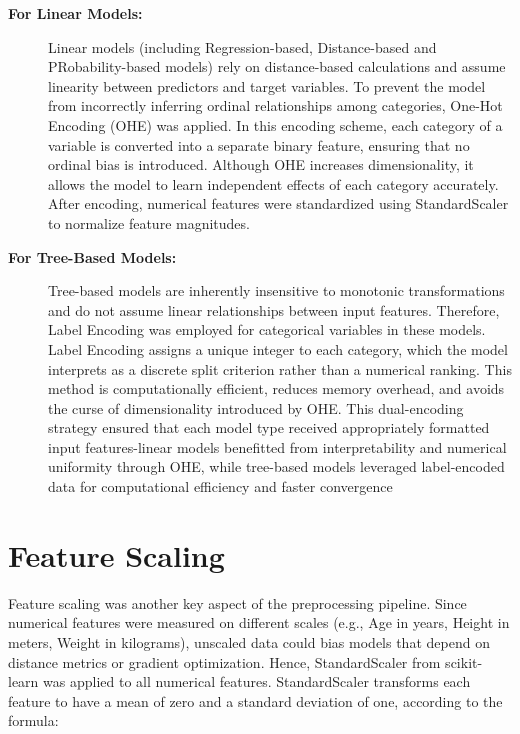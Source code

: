 \begin{description}
    \item[\textbf{For Linear Models:}]
    Linear models (including Regression-based, Distance-based and PRobability-based models) rely on distance-based calculations and assume linearity between predictors and target variables.
    To prevent the model from incorrectly inferring ordinal relationships among categories, One-Hot Encoding (OHE) was applied.
    In this encoding scheme, each category of a variable is converted into a separate binary feature, ensuring that no ordinal bias is introduced.
    Although OHE increases dimensionality, it allows the model to learn independent effects of each category accurately.
    After encoding, numerical features were standardized using StandardScaler to normalize feature magnitudes.

    \item[\textbf{For Tree-Based Models:}]
    Tree-based models are inherently insensitive to monotonic transformations and do not assume linear relationships between input features.
    Therefore, Label Encoding was employed for categorical variables in these models.
    Label Encoding assigns a unique integer to each category, which the model interprets as a discrete split criterion rather than a numerical ranking.
    This method is computationally efficient, reduces memory overhead, and avoids the curse of dimensionality introduced by OHE. This dual-encoding strategy ensured that each model type received appropriately formatted input features-linear models benefitted from interpretability and numerical uniformity through OHE, while tree-based models leveraged label-encoded data for computational efficiency and faster convergence
\end{description}



\section{Feature Scaling}\label{sec:feature-scaling}

Feature scaling was another key aspect of the preprocessing pipeline.
Since numerical features were measured on different scales (e.g., Age in years, Height in meters, Weight in kilograms), unscaled data could bias models that depend on distance metrics or gradient optimization.
Hence, StandardScaler from scikit-learn was applied to all numerical features.
StandardScaler transforms each feature to have a mean of zero and a standard deviation of one, according to the formula:

